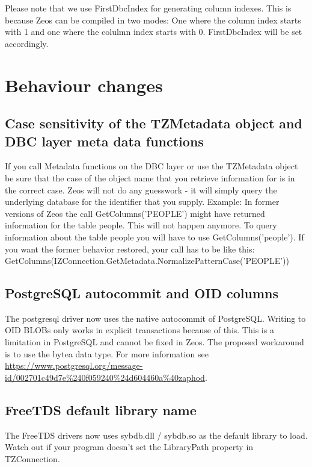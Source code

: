 \documentclass[a4paper,12pt,oneside]{article}
\begin{document}
Please note that we use FirstDbcIndex for generating column indexes.
This is because Zeos can be compiled in two modes: 
One where the column index starts with 1 and one where the colulmn index starts with 0. 
FirstDbcIndex will be set accordingly.

\section{Behaviour changes}
\label{sec:BreakingChanges}
\subsection{Case sensitivity of the TZMetadata object and DBC layer meta data functions}
\label{sec:BreakingChanges_MetadataCaseSensitivity}
If you call Metadata functions on the DBC layer or use the TZMetadata object be sure that the case of the object name that you retrieve information for is in the correct case.
Zeos will not do any guesswork - it will simply query the underlying database for the identifier that you supply.
Example: In former versions of Zeos the call GetColumns('PEOPLE') might have returned information for the table people.
This will not happen anymore.
To query information about the table people you will have to use GetColumns('people').
If you want the former behavior restored, your call has to be like this:\\
GetColumns(\-IZConnection.\-GetMetadata.\-NormalizePatternCase('PEOPLE'))

\subsection{PostgreSQL autocommit and OID columns}
\label{sec:BreakingChanges_PostgresqlAutocommitOids}
The postgresql driver now uses the native autocommit of PostgreSQL.
Writing to OID BLOBs only works in explicit transactions because of this. 
This is a limitation in PostgreSQL and cannot be fixed in Zeos.
The proposed workaround is to use the bytea data type.
For more information see \url{https://www.postgresql.org/message-id/002701c49d7e%240f059240%24d604460a%40zaphod}.

\subsection{FreeTDS default library name}
\label{sec:BreakingChanges_FreetdsDefaultLIbraryName}
The FreeTDS drivers now uses sybdb.dll / sybdb.so as the default library to load.
Watch out if your program doesn't set the LibraryPath property in TZConnection.
\end{document}
